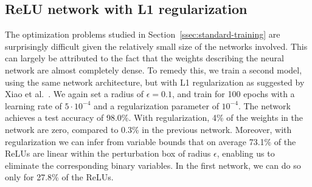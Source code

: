 \documentclass[smallextended]{svjour3}
\newcommand{\blue}[1]{{#1}}
\begin{document}



\subsection{ReLU network with L1 regularization} \label{ssec:l1-regularization}

The optimization problems studied in Section~\ref{ssec:standard-training} are surprisingly difficult given the relatively small size of the networks involved. This can largely be attributed to the fact that the weights describing the neural network are almost completely dense. To remedy this, we train a second model, using the same network architecture, but with L1 regularization as suggested by Xiao et al.~\cite{Xiao:2018}. We again set a radius of $\epsilon=0.1$, and train for 100 epochs with a learning rate of $5 \cdot 10^{-4}$ and a regularization parameter of $10^{-4}$. \blue{The network achieves a test accuracy of 98.0\%. With regularization, 4\% of the weights in the network are zero, compared to 0.3\% in the previous network. Moreover, with regularization we can infer from variable bounds that on average 73.1\% of the ReLUs are linear within the perturbation box of radius $\epsilon$, enabling us to eliminate the corresponding binary variables. In the first network, we can do so only for 27.8\% of the ReLUs.}
\end{document}
